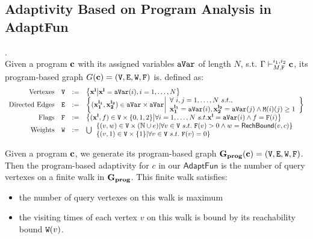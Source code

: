 \documentclass[a4paper,11pt]{article}
\newcommand{\THESYSTEM}{\textsf{AdaptFun}}
\begin{document}
\subsection{Adaptivity Based on Program Analysis in \THESYSTEM}
%
 \begin{defn}
.
\label{def:prog-based_graph}
\\
Given a program $\boldsymbol{\mathbf{c}}$ with its assigned variables $\mathtt{aVar}$ of length $N$, s.t. $\Gamma \vdash_{M, \mathtt{F}}^{i_1,i_2} \boldsymbol{\mathbf{c}}$, 
its program-based graph 
$G(\boldsymbol{\mathbf{c}}) = (\mathtt{V}, \mathtt{E}, \mathtt{W}, \mathtt{F})$ is. defined as:
\\
\[
\begin{array}{rlcl}
	\text{Vertexes} &
	\vertxs & := & \left\{ 
	\ssa{x^l} \middle\vert
	\ssa{x^l} = \avar(i), i = 1, \ldots, N 
	\right\}
	\\
	\text{Directed Edges} &
	\edges & := & 
	\left\{ 
	(\ssa{x_1^{l_1}}, \ssa{x_2^{l_2}}) 
	\in \avar \times \avar 
	\middle\vert
	\begin{array}{l}
		\forall ~ i,j = 1, \ldots, N ~ s.t., ~\\
		\ssa{x_1^{l_1}} = \avar(i),  \ssa{x_2^{l_2}} = \avar(j) \land
		\Mtrix(i)(j) \geq 1
	\end{array} 
	\right\}
	\\
	\text{Flags} &
	\flag & := & 
	\left\{(\ssa{x^l}, f)  \in \vertxs \times \{0, 1, 2\} 
	\middle\vert 
	\forall i = 1, \ldots, N ~  s.t.
	\ssa{x^l} = \avar(i) \land f = \flag(i)
	\right\}
	\\
	\text{Weights} &
	\weights & := &
	\bigcup
	\begin{array}{l}
		\left\{ (v, w) \in \vertxs \times (\mathbb{N} \cup \expr)
		\middle\vert
		\forall v \in \vertxs ~  s.t. ~ \flag(v) > 0 \land w = \rb(v, c)
		\right\} 
		\\
		\left\{(v, 1)  \in \vertxs \times \{1\} 
		\middle\vert 
		\forall v \in \vertxs ~  s.t. ~ \flag(v) = 0
		\right\}
	\end{array} 
\end{array}
\]
\end{defn} 
%
Given a program $\boldsymbol{\mathbf{c}}$, we generate its program-based graph 
$\mathtt{\bf{G_{prog}}}(\boldsymbol{\mathbf{c}}) = (\mathtt{V}, \mathtt{E}, \mathtt{W}, \mathtt{F})$.
%
Then the program-based adaptivity for $c$ in our $\THESYSTEM$ is the number of query vertexes on a finite walk in $\mathtt{\bf{G_{prog}}}$. This finite walk satisfies:
\begin{itemize}
\item the number of query vertexes on this walk is maximum
\item the visiting times of each vertex $v$ on this walk is bound by its reachability bound $\mathtt{W}(v)$.
\end{itemize}
\end{document}

